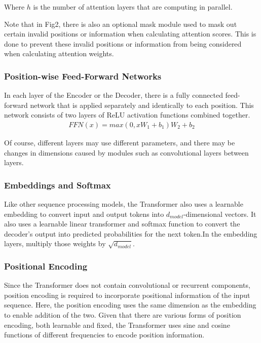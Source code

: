 \documentclass[conference]{IEEEtran}
\begin{document}
\par Where $h$ is the number of attention layers that are computing in parallel.

\par Note that in Fig2, there is also an optional mask module used to mask out certain 
invalid positions or information when calculating attention scores. This is done 
to prevent these invalid positions or information from being considered when calculating 
attention weights.

\subsubsection{Position-wise Feed-Forward Networks}

\par In each layer of the Encoder or the Decoder, there is a fully connected feed-forward 
network that is applied  separately and identically to each position. This network consists of 
two layers of ReLU activation functions combined together.
\begin{align*}
    FFN(x) = max(0, xW_1 + b_1)W_2 + b_2
\end{align*}

\par Of course, different layers may use different parameters, and there may be changes 
in dimensions caused by modules such as convolutional layers between layers.

\subsubsection{Embeddings and Softmax}

\par Like other sequence processing models, the Transformer also uses a learnable 
embedding to convert input and output tokens into $d_{model}$-dimensional vectors. It also 
uses a learnable linear transformer and softmax function to convert the decoder's output 
into predicted probabilities for the next token.In the embedding layers, 
multiply those weights by $\sqrt{d_{model}}$.

\subsubsection{Positional Encoding}

\par Since the Transformer does not contain convolutional or recurrent components, 
position encoding is required to incorporate positional information of the input sequence. 
Here, the position encoding uses the same dimension as the embedding to enable addition of the two. 
Given that there are various forms of position encoding, both learnable and fixed, 
the Transformer uses sine and cosine functions of different frequencies to encode position information.
\end{document}

